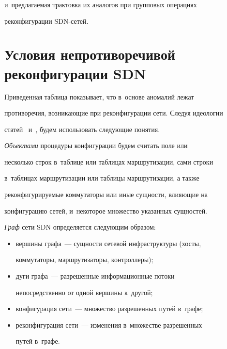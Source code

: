 и~предлагаемая трактовка их аналогов при групповых операциях 


реконфигурации SDN-се\-тей.





    


\section{Условия непротиворечивой реконфигурации SDN}


 


  Приведенная таблица показывает, что в~основе аномалий лежат 


противоречия, возникающие при реконфигурации сети. Следуя идеологии 


статей~\cite{6-g3} и~\cite{10-g3}, будем использовать следующие понятия.


  


  \textit{Объектами} процедуры конфигурации будем считать поле или 


несколько строк в~таблице или таблицах маршрутизации, сами строки 


в~таблицах маршрутизации или таблицы маршрутизации, а также 


реконфигурируемые коммутаторы или иные сущности, влияющие на 


конфигурацию сетей, и~некоторое множество указанных сущностей. 


  


  \textit{Граф} сети SDN определяется следующим образом:


  \begin{itemize}


\item вершины графа~--- сущности сетевой инфраструктуры (хосты, 


коммутаторы, маршрутизаторы, контроллеры);


\item дуги графа~--- разрешенные информационные потоки 


непосредственно от одной вершины к~другой;


\item конфигурация сети~--- множество разрешенных путей в~графе;


\item реконфигурация сети~--- изменения в~множестве разрешенных 


путей в~графе.


\end{itemize}






